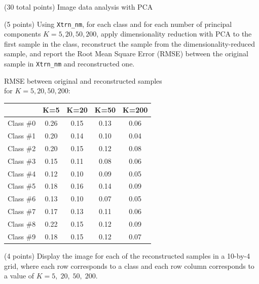 \documentclass[12pt]{article}
\begin{document}
\begin{question}{(30 total points) Image data analysis with PCA}
   \begin{subquestion}{(5 points)
       Using \texttt{Xtrn\_nm}, 
       for each class and for each number of principal components $K =
       5, 20, 50, 200$, apply dimensionality reduction with PCA to the
       first sample in the class, reconstruct the sample from the
       dimensionality-reduced sample, and 
       report the Root Mean Square Error (RMSE) between the
       original sample in {\tt Xtrn\_nm} and reconstructed one.
     } \label{Q1.6}

     

      \begin{answerbox}{25em}
      \begin{center}
      	RMSE between original and reconstructed samples \\for $K = 5,20,50,200$:\\
      \end{center}
      	\begin{center}
         \begin{tabular}{|c|c|c|c|c|}
         \hline 
        & K=5 & K=20 & K=50 & K=200 \\ \hline
	    Class \#0 & 0.26 & 0.15 & 0.13 & 0.06\\
		Class \#1 & 0.20 & 0.14 & 0.10 & 0.04\\
		Class \#2 & 0.20 & 0.15 & 0.12 & 0.08\\
		Class \#3 & 0.15 & 0.11 & 0.08 & 0.06\\
		Class \#4 & 0.12 & 0.10 & 0.09 & 0.05\\
		Class \#5 & 0.18 & 0.16 & 0.14 & 0.09\\
		Class \#6 & 0.13 & 0.10 & 0.07 & 0.05\\
		Class \#7 & 0.17 & 0.13 & 0.11 & 0.06\\
		Class \#8 & 0.22 & 0.15 & 0.12 & 0.09\\
		Class \#9 & 0.18 & 0.15 & 0.12 & 0.07\\
		\hline
         \end{tabular} 
         \end{center}
      \end{answerbox}
  


   \end{subquestion}
   
   \begin{subquestion}{(4 points)
       Display the image for each of the reconstructed samples in
       a 10-by-4 grid, where each row corresponds to a class and
       each row column corresponds to a value of $K=5, \; 20, \; 50, \; 200$.
     } \label{Q1.7}



\end{subquestion}
\end{question}
\end{document}
